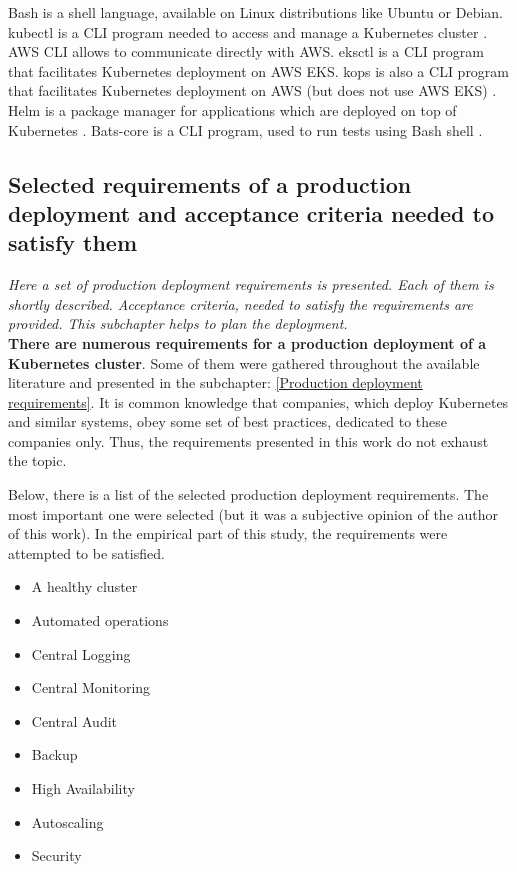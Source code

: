 Bash is a shell language, available on Linux distributions like Ubuntu or Debian. kubectl is a CLI program needed to access and manage a Kubernetes cluster \cite{kubectl}. AWS CLI allows to communicate directly with AWS. eksctl is a CLI program that facilitates Kubernetes deployment on AWS EKS\cite{eksctl}. kops is also a CLI program that facilitates Kubernetes deployment on AWS (but does not use AWS EKS) \cite{online-kops}. Helm is a package manager for applications which are deployed on top of Kubernetes \cite{helm}. Bats-core is a CLI program, used to run tests using Bash shell \cite{bats-core}.

\subsection{Selected requirements of a production deployment and acceptance criteria needed to satisfy them}
\textit{Here a set of production deployment requirements is presented. Each of them is shortly described. Acceptance criteria, needed to satisfy the requirements are provided. This subchapter helps to plan the deployment.}
\\

\textbf{There are numerous requirements for a production deployment of a Kubernetes cluster}. Some of them were gathered throughout the available literature and presented in the subchapter: \ref{Production deployment requirements}. It is common knowledge that companies, which deploy Kubernetes and similar systems, obey some set of best practices, dedicated to these companies only. Thus, the requirements presented in this work do not exhaust the topic.

Below, there is a list of the selected production deployment requirements. The most important one were selected (but it was a subjective opinion of the author of this work). In the empirical part of this study, the requirements were  attempted to be satisfied.
\begin{itemize}
\item A healthy cluster
\item Automated operations
\item Central Logging
\item Central Monitoring
\item Central Audit
\item Backup
\item High Availability
\item Autoscaling
\item Security
\end{itemize}

